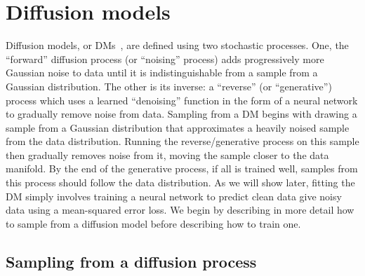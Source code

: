 \chapter{Diffusion models}
\label{ch:diffusion}

Diffusion models, or DMs~\citep{sohl2015deep,ho2020denoising,nichol2021improved,song2020score}, are defined using two stochastic processes. One, the ``forward'' diffusion process (or ``noising'' process) adds progressively more Gaussian noise to data until it is indistinguishable from a sample from a Gaussian distribution. The other is its inverse: a ``reverse'' (or ``generative'') process which uses a learned ``denoising'' function in the form of a neural network to gradually remove noise from data. Sampling from a DM begins with drawing a sample from a Gaussian distribution that approximates a heavily noised sample from the data distribution. Running the reverse/generative process on this sample then gradually removes noise from it, moving the sample closer to the data manifold. By the end of the generative process, if all is trained well, samples from this process should follow the data distribution. As we will show later, fitting the DM simply involves training a neural network to predict clean data give noisy data using a mean-squared error loss.  We begin by describing in more detail how to sample from a diffusion model before describing how to train one.

\section{Sampling from a diffusion process}

